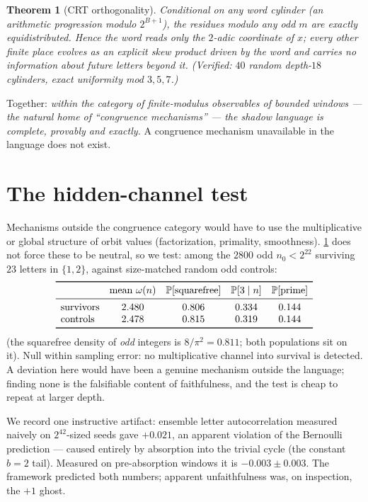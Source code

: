 \documentclass[11pt]{article}
\newtheorem{theorem}{Theorem}
\begin{document}
\begin{theorem}[CRT orthogonality]\label{thm:crt}
Conditional on any word cylinder (an arithmetic progression modulo
$2^{B+1}$), the residues modulo any odd $m$ are \emph{exactly}
equidistributed. Hence the word reads only the $2$-adic coordinate of
$x$; every other finite place evolves as an explicit skew product
driven by the word and carries no information about future letters
beyond it. (Verified: $40$ random depth-$18$ cylinders, exact
uniformity mod $3,5,7$.)
\end{theorem}

Together: \emph{within the category of finite-modulus observables of
bounded windows --- the natural home of ``congruence mechanisms'' ---
the shadow language is complete, provably and exactly.} A congruence
mechanism unavailable in the language does not exist.

\section{The hidden-channel test}

Mechanisms outside the congruence category would have to use the
multiplicative or global structure of orbit values (factorization,
primality, smoothness). \cref{thm:crt} does not force these to be
neutral, so we test: among the $2800$ odd $n_0<2^{22}$ surviving
$23$ letters in $\{1,2\}$, against size-matched random odd controls:
\[
\begin{array}{lcccc}
\toprule
 & \text{mean }\omega(n) & \mathbb P[\text{squarefree}] &
 \mathbb P[3\mid n] & \mathbb P[\text{prime}]\\
\midrule
\text{survivors} & 2.480 & 0.806 & 0.334 & 0.144\\
\text{controls} & 2.478 & 0.815 & 0.319 & 0.144\\
\bottomrule
\end{array}
\]
(the squarefree density of \emph{odd} integers is $8/\pi^2=0.811$;
both populations sit on it). Null within sampling error: no
multiplicative channel into survival is detected. A deviation here
would have been a genuine mechanism outside the language; finding
none is the falsifiable content of faithfulness, and the test is
cheap to repeat at larger depth.

We record one instructive artifact: ensemble letter autocorrelation
measured naively on $2^{42}$-sized seeds gave $+0.021$, an apparent
violation of the Bernoulli prediction --- caused entirely by
absorption into the trivial cycle (the constant $b=2$ tail). Measured
on pre-absorption windows it is $-0.003\pm0.003$. The framework
predicted both numbers; apparent unfaithfulness was, on inspection,
the $+1$ ghost.
\end{document}
